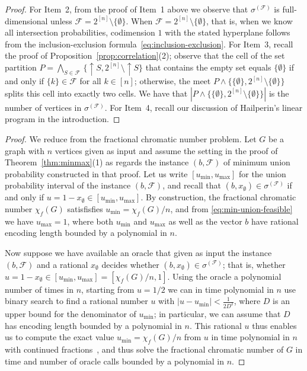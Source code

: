 \documentclass[11pt]{article}
\newcommand{\up}{\ensuremath{\sigma}}
\begin{document}
\begin{proof}
For Item~2, from the proof of Item~1 above we observe that 
$\up^{(\mathcal{F})}$ is full-dimensional unless 
$\mathcal{F}=2^{[n]}\setminus\{\emptyset\}$. 
When $\mathcal{F}=2^{[n]}\setminus\{\emptyset\}$, that is, when we know
all intersection probabilities, codimension $1$ with
the stated hyperplane follows from 
the inclusion-exclusion formula~\eqref{eq:inclusion-exclusion}.
%
For Item~3, recall the proof of Proposition~\ref{prop:correlation}(2);
observe that the cell of the set partition
$P=\bigwedge_{S\in\mathcal{F}}\,\{\uparrow\!S,2^{[n]}\setminus\!\uparrow\!S\}$
that contains the empty set equals $\{\emptyset\}$ if and only if 
$\{k\}\in\mathcal{F}$ for all $k\in [n]$; otherwise, the meet
$P\wedge\{\{\emptyset\},2^{[n]}\setminus\{\emptyset\}\}$ splits this cell
into exactly two cells. We have that 
$|P\wedge\{\{\emptyset\},2^{[n]}\setminus\{\emptyset\}\}|$ is the
number of vertices in $\up^{(\mathcal{F})}$. 
%
For Item~4, recall our discussion of Hailperin's linear program in 
the introduction.
\end{proof}

\unionmember*

\begin{proof}
We reduce from the fractional chromatic number problem.
Let $G$ be a graph with $n$ vertices given as input and 
assume the setting in the proof of Theorem~\ref{thm:minmax}(1) 
as regards the instance $(b,\mathcal{F})$ of minimum union probability 
constructed in that proof. Let us write $[u_\text{min},u_\text{max}]$ 
for the union probability interval of the instance $(b,\mathcal{F})$, and 
recall that $(b,x_\emptyset)\in\up^{(\mathcal{F})}$ if and only if 
$u=1-x_\emptyset\in[u_\text{min},u_\text{max}]$. 
By construction, the fractional
chromatic number $\chi_f(G)$ satisfisfies $u_\text{min}=\chi_f(G)/n$,
and from \eqref{eq:min-union-feasible} we have $u_\text{max}=1$, where 
both $u_\text{min}$ and $u_\text{max}$ as well as the vector $b$ have 
rational encoding length bounded by a polynomial in $n$. 

Now suppose we have available an oracle that given as input 
the instance $(b,\mathcal{F})$ and a rational $x_\emptyset$ decides whether 
$(b,x_\emptyset)\in\up^{(\mathcal{F})}$; that is, whether 
$u=1-x_\emptyset\in [u_\text{min},u_\text{max}]=[\chi_f(G)/n,1]$.
Using the oracle a polynomial number of times in $n$, starting from $u=1/2$ 
we can in time polynomial in $n$ use binary search to find a rational 
number $u$ with $|u-u_\text{min}|<\frac{1}{2D^2}$, where $D$ is an upper bound 
for the denominator of $u_\text{min}$; in particular, we can assume that $D$ 
has encoding length bounded by a polynomial in $n$. 
This rational $u$ thus enables us to compute 
the exact value $u_\text{min}=\chi_f(G)/n$ from $u$ in time polynomial 
in $n$ with continued fractions~\cite[Theorem 5.1.9]{GrotschelLS1993}, and 
thus solve the fractional chromatic number of $G$ in time and number of 
oracle calls bounded by a polynomial in $n$.
\end{proof}
\end{document}
